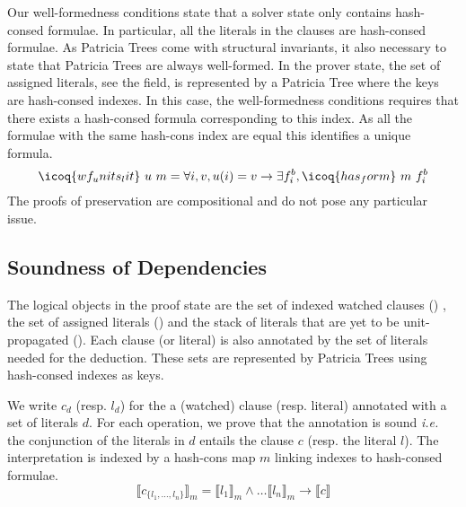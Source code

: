 \documentclass[a4paper,UKenglish,cleveref, autoref, thm-restate]{lipics-v2019}
\begin{document}
Our well-formedness conditions state that a solver state
 only contains hash-consed formulae. In particular, all
the literals in the clauses are hash-consed formulae.
%
As Patricia Trees come with structural invariants, it also necessary
to state that Patricia Trees are always well-formed. 
%
In the prover state, the set of assigned literals, see the
 field, is represented by a Patricia Tree  where the keys are hash-consed indexes.  In this
case, the well-formedness conditions requires that there exists a
hash-consed formula corresponding to this index.  As all the formulae
with the same hash-cons index are equal this identifies a unique
formula.
\[
  \icoq{wf_units_lit}\ u\ m = \forall i,v, u(i) = v \to \exists f_i^b, \icoq{has_form}\ m\ f_i^b
\]
The proofs of preservation are compositional and do not pose any particular issue.

\subsection{Soundness of Dependencies}

The logical objects in the proof state are the set of indexed watched
clauses () , the set of assigned literals ()
and the stack of literals that are yet to be unit-propagated
(). Each clause (or literal) is also
annotated by the set of literals needed for the deduction.
%
These sets are represented by Patricia Trees using hash-consed indexes as keys.

We write $c_d$ (resp. $l_d$) for the a (watched) clause
(resp. literal) annotated with a set of literals $d$. For each
operation, we prove that the annotation is sound \emph{i.e.}
the conjunction of the literals in $d$ entails the clause $c$ (resp. the literal $l$).
The interpretation is indexed by a hash-cons map $m$ linking indexes to hash-consed formulae.
\[
  \llbracket c_{\{l_1,\dots,l_n\}} \rrbracket_m = \llbracket l_1
  \rrbracket_m \land \dots \llbracket l_n \rrbracket_m \rightarrow
  \llbracket c \rrbracket
\]
\end{document}
